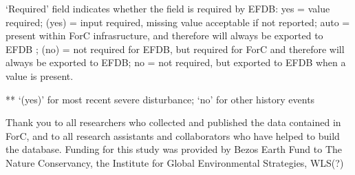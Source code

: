 \documentclass[, manuscript]{copernicus}
\begin{document}
`Required' field indicates whether the field is required by EFDB: yes =
value required; (yes) = input required, missing value acceptable if not
reported; auto = present within ForC infrasructure, and therefore will
always be exported to EFDB ; (no) = not required for EFDB, but required
for ForC and therefore will always be exported to EFDB; no = not
required, but exported to EFDB when a value is present.

** `(yes)' for most recent severe disturbance; `no' for other history
events











\begin{acknowledgements}
Thank you to all researchers who collected and published the data
contained in ForC, and to all research assistants and collaborators who
have helped to build the database. Funding for this study was provided
by Bezos Earth Fund to The Nature Conservancy, the Institute for Global
Environmental Strategies, WLS(?)
\end{acknowledgements}





\end{document}
